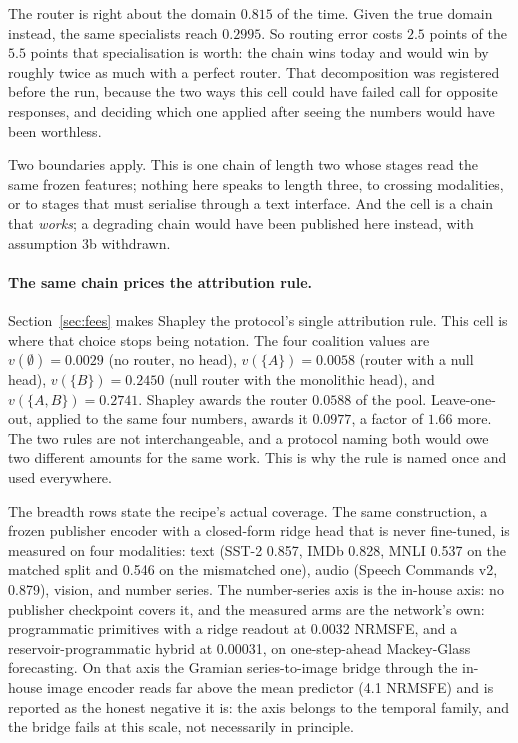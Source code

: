 \documentclass[11pt]{article}
\begin{document}
The router is right about the domain $0.815$ of the time. Given
the true domain instead, the same specialists reach $0.2995$. So
routing error costs $2.5$ points of the $5.5$ points that
specialisation is worth: the chain wins today and would win by
roughly twice as much with a perfect router. That decomposition
was registered before the run, because the two ways this cell
could have failed call for opposite responses, and deciding which
one applied after seeing the numbers would have been worthless.

Two boundaries apply. This is one chain of length two whose stages
read the same frozen features; nothing here speaks to length
three, to crossing modalities, or to stages that must serialise
through a text interface. And the cell is a chain that
\emph{works}; a degrading chain would have been published here
instead, with assumption 3b withdrawn.

\paragraph{The same chain prices the attribution rule.}
Section~\ref{sec:fees} makes Shapley the protocol's single
attribution rule. This cell is where that choice stops being
notation. The four coalition values are $v(\emptyset) = 0.0029$
(no router, no head), $v(\{A\}) = 0.0058$ (router with a null
head), $v(\{B\}) = 0.2450$ (null router with the monolithic
head), and $v(\{A,B\}) = 0.2741$. Shapley awards the router
$0.0588$ of the pool. Leave-one-out, applied to the same four
numbers, awards it $0.0977$, a factor of $1.66$ more. The two
rules are not interchangeable, and a protocol naming both would
owe two different amounts for the same work. This is why the rule
is named once and used everywhere.

The breadth rows state the recipe's actual coverage. The same
construction, a frozen publisher encoder with a closed-form
ridge head that is never fine-tuned, is measured on four modalities:
text (SST-2 0.857, IMDb 0.828, MNLI 0.537 on the matched split
and 0.546 on the mismatched one), audio (Speech Commands v2,
0.879), vision, and number series. The number-series axis is the
in-house axis: no publisher checkpoint covers it, and the
measured arms are the network's own: programmatic primitives
with a ridge readout at 0.0032 NRMSFE, and a
reservoir-programmatic hybrid at 0.00031, on one-step-ahead
Mackey-Glass forecasting. On that axis the Gramian
series-to-image bridge through the in-house image encoder reads
far above the mean predictor (4.1 NRMSFE) and is reported as the
honest negative it is: the axis belongs to the temporal family,
and the bridge fails at this scale, not necessarily in
principle.
\end{document}
